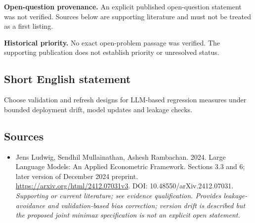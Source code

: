 \documentclass[11pt]{article}
\begin{document}
\par\textbf{Open-question provenance.} An explicit published open-question statement was not verified. Sources below are supporting literature and must not be treated as a first listing.

\par\textbf{Historical priority.} No exact open-problem passage was verified. The supporting publication does not establish priority or unresolved status.

\subsection{Short English statement}
Choose validation and refresh designs for LLM-based regression measures under bounded deployment drift, model updates and leakage checks.

\subsection{Sources}
\begin{itemize}\raggedright
\item[\textnormal{[S1]}]\hypertarget{source:30007709:1}{} Jens Ludwig, Sendhil Mullainathan, Ashesh Rambachan. 2024. Large Language Models: An Applied Econometric Framework. Sections 3.3 and 6; later version of December 2024 preprint.
\url{https://arxiv.org/html/2412.07031v3}.
DOI: 10.48550/arXiv.2412.07031.
{\small\textit{Supporting or current literature; see evidence qualification. Provides leakage-avoidance and validation-based bias correction; version drift is described but the proposed joint minimax specification is not an explicit open statement.}}
\end{itemize}
\end{document}
